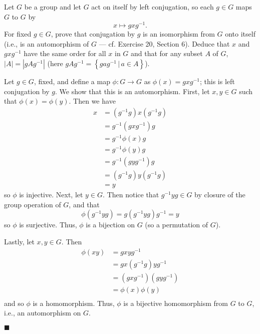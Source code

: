 \documentclass[12pt]{article}
\renewcommand{\qed}{\hfill$\blacksquare$}
\renewenvironment{proof}{\begin{addmargin}[1em]{0em}\begin{newproof}}{\end{newproof}\end{addmargin}\qed}
\newenvironment{problem}[2][Exercise]{\begin{trivlist}
\item[\hskip \labelsep {\bfseries #1}\hskip \labelsep {\bfseries #2.}]}{\end{trivlist}}
\begin{document}
\begin{problem}{1.7.17}
Let $G$ be a group and let $G$ act on itself by left conjugation, so each $g\in G$ maps $G$ to $G$ by $$x \mapsto gxg^{-1}. $$ For fixed $g\in G$, prove that conjugation by $g$ is an isomorphism from $G$ onto itself (i.e., is an automorphism of $G$ --- cf. Exercise 20, Section 6). Deduce that $x$ and $gxg^{-1}$ have the same order for all $x$ in $G$ and that for any subset $A$ of $G$, $\left|A\right|=\left|gAg^{-1}\right|$ (here $gAg^{-1}=\left\{gag^{-1} \, | \, a\in A\right\}$).
\end{problem}
\begin{proof}
Let $g\in G$, fixed, and define a map $\phi:G\rightarrow G$ as $\phi\left(x\right)=gxg^{-1}$; this is left conjugation by $g$. We show that this is an automorphism. First, let $x,y\in G$ such that $\phi\left(x\right)=\phi\left(y\right)$. Then we have
\begin{equation*}
    \begin{split}
        x & = \left(g^{-1}g\right)x\left(g^{-1}g\right) \\
        & = g^{-1}\left(gxg^{-1}\right)g \\
        & = g^{-1}\phi\left(x\right)g \\
        & = g^{-1}\phi\left(y\right)g \\
        & = g^{-1}\left(gyg^{-1}\right)g \\
        & = \left(g^{-1}g\right)y\left(g^{-1}g\right) \\
        & = y
    \end{split}
\end{equation*}
so $\phi$ is injective. Next, let $y \in G$. Then notice that $g^{-1}yg \in G$ by closure of the group operation of $G$, and that
$$ \phi\left(g^{-1}yg\right) = g\left(g^{-1}yg\right)g^{-1} = y $$ so $\phi$ is surjective. Thus, $\phi$ is a bijection on $G$ (so a permutation of $G$).

Lastly, let $x,y\in G$. Then
\begin{equation*}
    \begin{split}
        \phi\left(xy\right) & = gxyg^{-1} \\
        & = gx\left(g^{-1}g\right)yg^{-1} \\
        & = \left(gxg^{-1}\right)\left(gyg^{-1}\right) \\
        & = \phi\left(x\right)\phi\left(y\right) \\
    \end{split}
\end{equation*}
and so $\phi$ is a homomorphism. Thus, $\phi$ is a bijective homomorphism from $G$ to $G$, i.e., an automorphism on $G$.


\end{proof}
\end{document}
